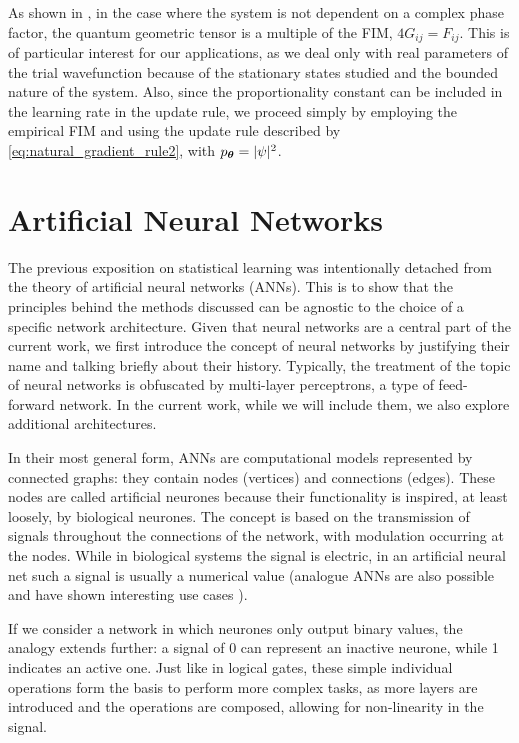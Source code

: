 As shown in \cite{stokes2020quantum}, in the case where the system is not dependent on a complex phase factor, the quantum geometric tensor is a multiple of the FIM, $4 G_{ij} = F_{ij}$. This is of particular interest for our applications, as we deal only with real parameters of the trial wavefunction because of the stationary states studied and the bounded nature of the system. Also, since the proportionality constant can be included in the learning rate in the update rule, we proceed simply by employing the empirical FIM and using the update rule described by \eqref{eq:natural_gradient_rule2}, with $p_{\boldsymbol{\theta}} = |\psi|^2$.

\section{Artificial Neural Networks}

The previous exposition on statistical learning was intentionally detached from the theory of artificial neural networks (ANNs). This is to show that the principles behind the methods discussed can be agnostic to the choice of a specific network architecture. Given that neural networks are a central part of the current work, we first introduce the concept of neural networks by justifying their name and talking briefly about their history. Typically, the treatment of the topic of neural networks is obfuscated by multi-layer perceptrons, a type of feed-forward network. In the current work, while we will include them, we also explore additional architectures.

In their most general form, ANNs are computational models represented by connected graphs: they contain nodes (vertices) and connections (edges). These nodes are called artificial neurones because their functionality is inspired, at least loosely, by biological neurones. The concept is based on the transmission of signals throughout the connections of the network, with modulation occurring at the nodes. While in biological systems the signal is electric, in an artificial neural net such a signal is usually a numerical value (analogue ANNs are also possible and have shown interesting use cases \cite{onen2022nanosecond}). 

If we consider a network in which neurones only output binary values, the analogy extends further: a signal of 0 can represent an inactive neurone, while 1 indicates an active one. Just like in logical gates, these simple individual operations form the basis to perform more complex tasks, as more layers are introduced and the operations are composed, allowing for non-linearity in the signal. 

